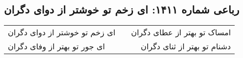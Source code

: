 \begin{center}
\section*{رباعی شماره ۱۴۱۱: ای زخم تو خوشتر از دوای دگران}
\label{sec:1411}
\begin{longtable}{l p{0.5cm} r}
ای زخم تو خوشتر از دوای دگران
&&
امساک تو بهتر از عطای دگران
\\
ای جور تو بهتر از وفای دگران
&&
دشنام تو بهتر از ثنای دگران
\\
\end{longtable}
\end{center}
